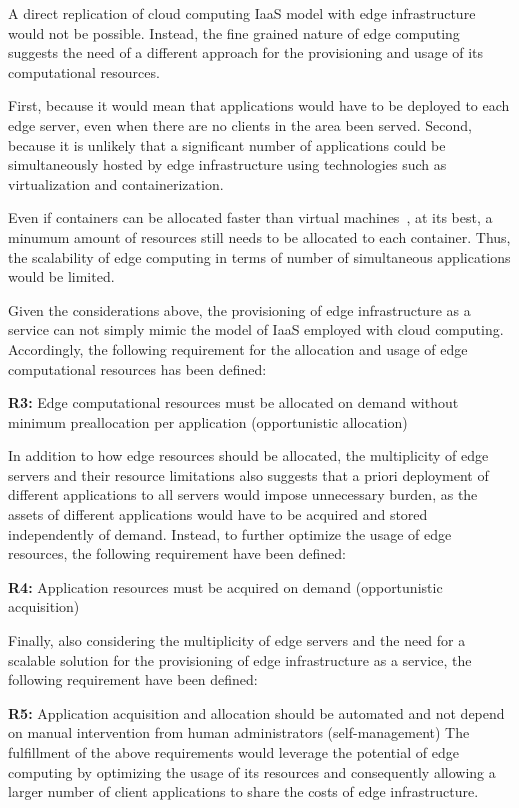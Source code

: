 A direct replication of cloud computing IaaS model with edge infrastructure would not be possible. Instead, the fine grained nature of edge computing suggests the need of a different approach for the provisioning and usage of its computational resources. 

First, because it would mean that applications would have to be deployed to each edge server, even when there are no clients in the area been served. 
Second, because it is unlikely that a significant number of applications could be simultaneously hosted by edge infrastructure using technologies such as virtualization and containerization. 

Even if containers can be allocated faster than virtual machines~\cite{Giovanni}, at its best, a minumum amount of resources still needs to be allocated to each container. Thus, the scalability of edge computing in terms of number of simultaneous applications would be limited. 

Given the considerations above, the provisioning of edge infrastructure as a service can not simply mimic the model of IaaS employed with cloud computing. Accordingly, the following requirement for the allocation and usage of edge computational resources has been defined:
 
\textbf{R3:} Edge computational resources must be allocated on demand without minimum preallocation per application (opportunistic allocation) 
	
In addition to how edge resources should be allocated, the multiplicity of edge servers and their resource limitations also suggests that a priori deployment of different applications to all servers would impose unnecessary burden, as the assets of different applications would have to be acquired and stored independently of demand. Instead, to further optimize the usage of edge resources, the following requirement have been defined: 	

\textbf{R4:} Application resources must be acquired on demand (opportunistic acquisition) 

Finally, also considering the multiplicity of edge servers and the need for a scalable solution for the provisioning of edge infrastructure as a service, the following requirement have been defined:

\textbf{R5:} Application acquisition and allocation should be automated and not depend on  manual intervention from human administrators (self-management)
The fulfillment of the above requirements would leverage the potential of edge computing by optimizing the usage of its resources and consequently allowing a larger number of client applications to share the costs of edge infrastructure.

